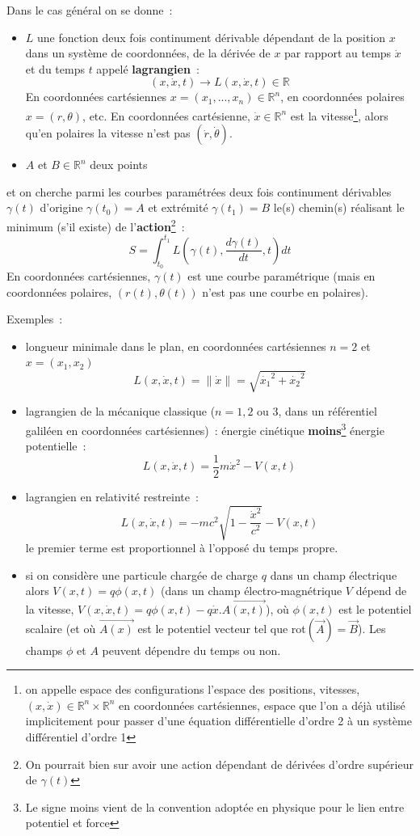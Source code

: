 \documentclass[a4paper,11pt]{article}
\begin{document}
\begin{giacjshere}
Dans le cas g\'en\'eral on se donne~:
\begin{itemize}
\item $L$ une fonction deux fois continument d\'erivable
d\'ependant de la position $x$ dans un
syst\`eme de coordonn\'ees, de la d\'eriv\'ee de $x$ par rapport au 
temps $\dot{x}$ et du temps $t$ appel\'e
{\bf lagrangien}~:
$$(x,\dot{x},t) \rightarrow L(x,\dot{x},t) \in \mathbb{R} $$ 
En coordonn\'ees cart\'esiennes $x=(x_1,...,x_n)\in \mathbb{R}^n$,
en coordonn\'ees polaires $x=(r,\theta)$, etc.
En coordonn\'ees cart\'esienne, 
$\dot{x}\in \mathbb{R}^n$ est la vitesse\footnote{on appelle espace
des configurations l'espace des positions, vitesses,
$(x,\dot{x}) \in \mathbb{R}^n \times \mathbb{R}^n$ en coordonn\'ees cart\'esiennes,
espace que l'on a d\'ej\`a utilis\'e implicitement pour passer d'une
\'equation diff\'erentielle d'ordre 2 \`a un syst\`eme diff\'erentiel
d'ordre 1}, alors qu'en polaires la vitesse n'est pas 
$(\dot{r},\dot{\theta})$.
\item $A$ et $B \in \mathbb{R}^n$ deux points
\end{itemize}
et on cherche parmi les courbes param\'etr\'ees
deux fois continument d\'erivables
$\gamma(t)$ d'origine $\gamma(t_0)=A$ 
et extr\'emit\'e $\gamma(t_1)=B$ le(s) chemin(s) r\'ealisant le
minimum (s'il existe) de l'{\bf action}\footnote{On
pourrait bien sur avoir une action d\'ependant de d\'eriv\'ees
d'ordre sup\'erieur de $\gamma(t)$}~:
$$ S=\int_{t_0}^{t_1} L(\gamma(t),\frac{d\gamma(t)}{dt},t) dt $$
En coordonn\'ees cart\'esiennes, $\gamma(t)$ est une courbe
param\'etrique (mais en coordonn\'ees polaires, $(r(t),\theta(t))$
n'est pas une courbe en polaires).

Exemples~: 
\begin{itemize}
\item
longueur minimale dans le plan, en coordonn\'ees cart\'esiennes $n=2$ 
et $x=(x_1,x_2)$
$$L(x,\dot{x},t)=\| \dot{x} \|=\sqrt{\dot{x_1}^2+\dot{x_2}^2}$$
\item lagrangien de la m\'ecanique classique ($n=1,2$ ou 3, dans un
  r\'ef\'erentiel galil\'een en coordonn\'ees cart\'esiennes)~: 
\'energie cin\'etique 
{\bf moins}\footnote{Le signe moins vient de la convention adopt\'ee
en physique pour le lien entre potentiel et force}
\'energie potentielle~:
$$L(x,\dot{x},t)=\frac{1}{2}m\dot{x}^2-V(x,t)$$
\item lagrangien en relativit\'e restreinte~:
$$ L(x,\dot{x},t)=-mc^2\sqrt{1-\frac{\dot{x}^2}{c^2}}-V(x,t)$$
le premier terme est proportionnel \`a l'oppos\'e du temps propre.
\item si on consid\`ere une particule charg\'ee de charge $q$
dans un champ \'electrique alors $V(x,t)=q\phi(x,t)$
(dans un champ \'electro-magn\'etrique $V$ d\'epend
de la vitesse, $V(x,\dot{x},t)=q\phi(x,t)-q
\dot{x}.\overrightarrow{A(x,t)}$), o\`u $\phi(x,t)$ est le potentiel
scalaire (et o\`u $\overrightarrow{A(x)}$ est
le potentiel vecteur tel que
rot$(\overrightarrow{A})=\overrightarrow{B}$).
Les champs $\phi$ et $A$ peuvent d\'ependre du temps ou non.
\end{itemize}


\end{giacjshere}
\end{document}
